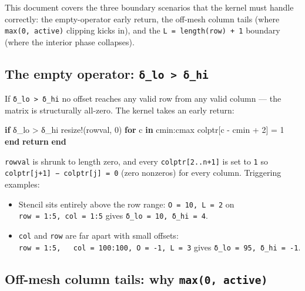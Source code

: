 \documentclass[
]{article}
\newenvironment{Shaded}{\begin{snugshade}}{\end{snugshade}}
\newcommand{\ControlFlowTok}[1]{\textcolor[rgb]{0.00,0.23,0.31}{\textbf{#1}}}
\newcommand{\FloatTok}[1]{\textcolor[rgb]{0.68,0.00,0.00}{#1}}
\newcommand{\FunctionTok}[1]{\textcolor[rgb]{0.28,0.35,0.67}{#1}}
\newcommand{\KeywordTok}[1]{\textcolor[rgb]{0.00,0.23,0.31}{\textbf{#1}}}
\newcommand{\NormalTok}[1]{\textcolor[rgb]{0.00,0.23,0.31}{#1}}
\newcommand{\OperatorTok}[1]{\textcolor[rgb]{0.37,0.37,0.37}{#1}}
\providecommand{\tightlist}{%
  \setlength{\itemsep}{0pt}\setlength{\parskip}{0pt}}
\begin{document}
This document covers the three boundary scenarios that the kernel must
handle correctly: the empty-operator early return, the off-mesh column
tails (where \texttt{max(0,\ active)} clipping kicks in), and the
\texttt{L\ =\ length(row)\ +\ 1} boundary (where the interior phase
collapses).

\subsection{\texorpdfstring{The empty operator:
\texttt{δ\_lo\ \textgreater{}\ δ\_hi}}{The empty operator: δ\_lo \textgreater{} δ\_hi}}\label{the-empty-operator-ux3b4_lo-ux3b4_hi}

If \texttt{δ\_lo\ \textgreater{}\ δ\_hi} no offset reaches any valid row
from any valid column --- the matrix is structurally all-zero. The
kernel takes an early return:

\begin{Shaded}
\begin{Highlighting}[]
\ControlFlowTok{if}\NormalTok{ δ\_lo }\OperatorTok{\textgreater{}}\NormalTok{ δ\_hi}
    \FunctionTok{resize!}\NormalTok{(rowval, }\FloatTok{0}\NormalTok{)}
    \ControlFlowTok{for}\NormalTok{ c }\KeywordTok{in}\NormalTok{ cmin}\OperatorTok{:}\NormalTok{cmax}
\NormalTok{        colptr[c }\OperatorTok{{-}}\NormalTok{ cmin }\OperatorTok{+} \FloatTok{2}\NormalTok{] }\OperatorTok{=} \FloatTok{1}
    \ControlFlowTok{end}
    \ControlFlowTok{return}
\ControlFlowTok{end}
\end{Highlighting}
\end{Shaded}

\texttt{rowval} is shrunk to length zero, and every
\texttt{colptr{[}2..n+1{]}} is set to \texttt{1} so
\texttt{colptr{[}j+1{]}\ −\ colptr{[}j{]}\ =\ 0} (zero nonzeros) for
every column. Triggering examples:

\begin{itemize}
\tightlist
\item
  Stencil sits entirely above the row range: \texttt{O\ =\ 10,\ L\ =\ 2}
  on \texttt{row\ =\ 1:5,\ col\ =\ 1:5} gives
  \texttt{δ\_lo\ =\ 10,\ δ\_hi\ =\ 4}.
\item
  \texttt{col} and \texttt{row} are far apart with small offsets:
  \texttt{row\ =\ 1:5,\ \ \ col\ =\ 100:100,\ O\ =\ -1,\ L\ =\ 3} gives
  \texttt{δ\_lo\ =\ 95,\ δ\_hi\ =\ -1}.
\end{itemize}

\subsection{\texorpdfstring{Off-mesh column tails: why
\texttt{max(0,\ active)}}{Off-mesh column tails: why max(0, active)}}\label{off-mesh-column-tails-why-max0-active}
\end{document}
